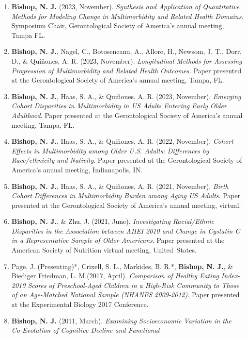 \documentclass[
]{article}
\begin{document}
\begin{enumerate}
\def\labelenumi{\arabic{enumi}.}
\item
  \textbf{Bishop, N. J.} (2023, November). \emph{Synthesis and
  Application of Quantitative Methods for Modeling Change in
  Multimorbidity and Related Health Domains.} Symposium Chair,
  Gerontological Society of America's annual meeting, Tampa FL\emph{.}
\item
  \textbf{Bishop, N. J.}, Nagel, C., Botoseneanu, A., Allore, H.,
  Newsom, J. T., Dorr, D., \& Quiñones, A. R. (2023, November).
  \emph{Longitudinal Methods for Assessing Progression of Multimorbidity
  and Related Health Outcomes.} Paper presented at the Gerontological
  Society of America's annual meeting, Tampa, FL.
\item
  \textbf{Bishop, N. J.}, Haas, S. A., \& Quiñones, A. R. (2023,
  November). \emph{Emerging Cohort Disparities in Multimorbidity in US
  Adults Entering Early Older Adulthood}. Paper presented at the
  Gerontological Society of America's annual meeting, Tampa, FL.
\item
  \textbf{Bishop, N. J.}, Haas, S. A., \& Quiñones, A. R. (2022,
  November). \emph{Cohort Effects in Multimorbidity among Older U.S.
  Adults: Differences by Race/ethnicity and Nativity}. Paper presented
  at the Gerontological Society of America's annual meeting,
  Indianapolis, IN.
\item
  \textbf{Bishop, N. J.}, Haas, S. A., \& Quiñones, A. R. (2021,
  November). \emph{Birth Cohort Differences in Multimorbidity Burden
  among Aging US Adults}. Paper presented at the Gerontological Society
  of America's annual meeting, virtual.
\item
  \textbf{Bishop, N. J.}, \& Zhu, J. (2021, June). \emph{Investigating
  Racial/Ethnic Disparities in the Association between AHEI 2010 and
  Change in Cystatin C in a Representative Sample of Older Americans}.
  Paper presented at the American Society of Nutrition virtual meeting,
  United~States.
\item
  Page, J. (Presenting)*, Crixell, S. L., Markides, B. R.*,
  \textbf{Bishop, N. J.}, \& Biediger Friedman, L. M.(2017, April).
  \emph{Comparison of Healthy Eating Index-2010 Scores of Preschool-Aged
  Children in a High-Risk Community to Those of an Age-Matched National
  Sample (NHANES 2009-2012)}. Paper presented at the Experimental
  Biology 2017 Conference.
\item
  \textbf{Bishop, N. J.} (2011, March). \emph{Examining Socioeconomic
  Variation in the Co-Evolution of Cognitive Decline and Functional
}
\end{enumerate}
\end{document}
